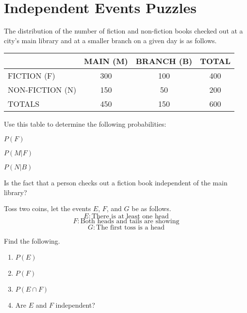 \section{Independent Events Puzzles}

The distribution of the number of fiction and non-fiction books checked out at a city's main library and at
a smaller branch on a given day is as follows.

\begin{center}
    \begin{tabular}{|l|c|c|c|}
        \hline
                        & MAIN (M) & BRANCH (B) & TOTAL \\ \hline
        FICTION (F)     & 300      & 100        & 400   \\
        \hline
        NON-FICTION (N) & 150      & 50         & 200   \\
        \hline
        TOTALS          & 450      & 150        & 600   \\
        \hline
    \end{tabular}
\end{center}
Use this table to determine the following probabilities:

\begin{puzzle}
    \(P(F)\)
\end{puzzle}

\begin{puzzle}
    \(P(M|F)\)
\end{puzzle}

\begin{puzzle}
    \(P(N|B)\)
\end{puzzle}

\begin{puzzle}
    Is the fact that a person checks out a fiction book independent of the main library?
\end{puzzle}

Toss two coins, let the events \( E \), \( F \), and \( G \) be as follows.
\[ E : \text{There is at least one head} \]
\[ F : \text{Both heads and tails are showing} \]
\[ G : \text{The first toss is a head} \]
\begin{puzzle}
    Find the following.
    \begin{enumerate}
        \item \( P(E) \)
        \item \( P(F) \)
        \item \( P(E \cap F) \)
        \item Are \( E \) and \( F \) independent?
    \end{enumerate}
\end{puzzle}

